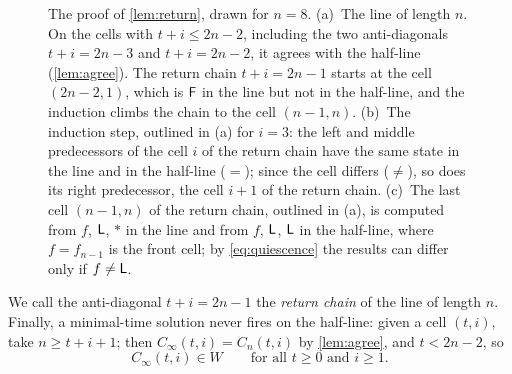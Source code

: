 \begin{figure}[t]
\centering

\caption{The proof of \cref{lem:return}, drawn for $n=8$. (a)~The line of
length $n$. On the cells with $t+i\le2n-2$, including the two anti-diagonals
$t+i=2n-3$ and $t+i=2n-2$, it agrees with the half-line (\cref{lem:agree}). The
return chain $t+i=2n-1$ starts at the cell $(2n-2,1)$, which is $\mathsf F$ in the
line but not in the half-line, and the induction climbs the chain to the cell
$(n-1,n)$. (b)~The induction step, outlined in (a) for $i=3$: the left and
middle predecessors of the cell $i$ of the return chain have the same state in
the line and in the half-line ($=$); since the cell differs ($\neq$), so does
its right predecessor, the cell $i+1$ of the return chain. (c)~The last cell
$(n-1,n)$ of the return chain, outlined in (a), is computed from $f$, $\mathsf L$,
$\ast$ in the line and from $f$, $\mathsf L$, $\mathsf L$ in the half-line, where
$f=f_{n-1}$ is the front cell; by \eqref{eq:quiescence} the results can differ
only if $f\neq\mathsf L$.}
\label{fig:return}
\end{figure}

We call the anti-diagonal $t+i=2n-1$ the \emph{return chain} of the line of
length $n$. Finally, a minimal-time solution never fires on the half-line:
given a cell $(t,i)$, take $n\ge t+i+1$; then $C_\infty(t,i)=C_n(t,i)$ by
\cref{lem:agree}, and $t<2n-2$, so
\begin{equation}\label{eq:neverfire}
C_\infty(t,i)\in W\qquad\text{for all }t\ge0\text{ and }i\ge1 .
\end{equation}
